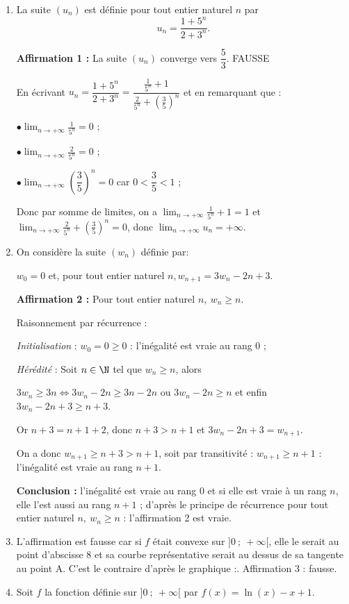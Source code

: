 \medskip

\begin{enumerate}
\item La suite $(u_n)$ est définie pour tout entier naturel $n$ par
\[u_n = \dfrac{1 + 5^n}{2 +3^n}.\]

\textbf{Affirmation 1 :} La suite $(u_n)$ converge vers $\dfrac 53$. FAUSSE

En écrivant $u_n = \dfrac{1 + 5^n}{2 +3^n} = \dfrac{\frac{1}{5^n} + 1}{\frac{2}{5^n} + \left(\frac 35 \right)^n}$ et en remarquant que :

$\bullet $$\displaystyle\lim_{n \to + \infty} \frac{1}{5^n} = 0$  ;

$\bullet $$\displaystyle\lim_{n \to + \infty} \frac{2}{5^n} = 0$  ;

$\bullet $$\displaystyle\lim_{n \to + \infty} \left(\dfrac 35 \right)^n = 0$ car $0 < \dfrac 35 < 1$ ;

Donc par somme de limites, on a $\displaystyle\lim_{n \to + \infty}\frac{1}{5^n} + 1 = 1$ et $\displaystyle\lim_{n \to + \infty}\frac{2}{5^n} + \left(\frac 35 \right)^n = 0$, donc $\displaystyle\lim_{n \to + \infty} u_n = + \infty$.
\item On considère la suite $(w_n)$ définie par:

\begin{center}$w_0 = 0$\: et, pour tout entier naturel\: $n, w_{n+1} = 3w_n - 2n + 3$.\end{center}

\textbf{Affirmation 2 :} Pour tout entier naturel $n,\: w_n \geqslant n$.

Raisonnement par récurrence :

\emph{Initialisation} : $w_0 = 0 \geqslant 0$  : l'inégalité est vraie au rang 0 ;

\emph{Hérédité} : Soit $n \in \N$ tel que $w_n \geqslant n$, alors 

$3w_n \geqslant 3n \iff 3w_n - 2n \geqslant 3n - 2n$ ou $3w_n - 2n \geqslant n$ et enfin $3w_n - 2n + 3 \geqslant n + 3$.

Or $n + 3 = n + 1 + 2$, donc $n + 3 > n + 1$ et $3w_n - 2n + 3 = w_{n+1}$.

On a donc $w_{n+1}\geqslant n + 3 > n + 1$, soit par transitivité : $w_{n+1}\geqslant n + 1$ : l'inégalité est vraie au rang $n + 1$.

\textbf{Conclusion :} l'inégalité est vraie au rang 0 et si elle est vraie à un rang $n$, elle l'est aussi au rang $n + 1$ ; d'après le principe de récurrence pour tout entier naturel $n,\: w_n \geqslant n$ : l'affirmation 2 est vraie.
\item L'affirmation est fausse car si $f$ était convexe sur $]0~;~+ \infty[$, elle le serait au point d'abscisse 8 et sa courbe représentative serait au dessus de sa tangente au  point A. C'est le contraire d'après le graphique :. Affirmation 3 : fausse.
\item Soit $f$ la fonction définie sur $]0~;~+ \infty[$ par $f(x) = \ln (x) - x + 1$.


\end{enumerate}
